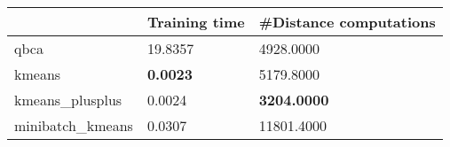 \begin{table}[htbp]
\centering
\begin{tabular}{lll}
\toprule
 & Training time & #Distance computations \\
\midrule
qbca & 19.8357 & 4928.0000 \\
kmeans & \textbf{0.0023} & 5179.8000 \\
kmeans_plusplus & 0.0024 & \textbf{3204.0000} \\
minibatch_kmeans & 0.0307 & 11801.4000 \\
\bottomrule
\end{tabular}
\end{table}

